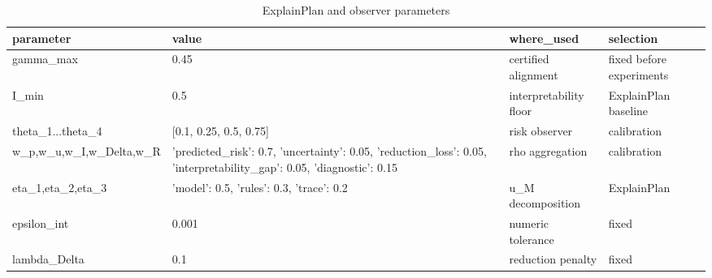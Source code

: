\begin{table}[h]
\centering
\caption{ExplainPlan and observer parameters}
\label{tab:explainplan\_params}
\begin{tabular}{|l|l|l|l|}
\hline
parameter & value & where\_used & selection \\
\hline
gamma\_max & 0.45 & certified alignment & fixed before experiments \\
\hline
I\_min & 0.5 & interpretability floor & ExplainPlan baseline \\
\hline
theta\_1...theta\_4 & [0.1, 0.25, 0.5, 0.75] & risk observer & calibration \\
\hline
w\_p,w\_u,w\_I,w\_Delta,w\_R & {'predicted\_risk': 0.7, 'uncertainty': 0.05, 'reduction\_loss': 0.05, 'interpretability\_gap': 0.05, 'diagnostic': 0.15} & rho aggregation & calibration \\
\hline
eta\_1,eta\_2,eta\_3 & {'model': 0.5, 'rules': 0.3, 'trace': 0.2} & u\_M decomposition & ExplainPlan \\
\hline
epsilon\_int & 0.001 & numeric tolerance & fixed \\
\hline
lambda\_Delta & 0.1 & reduction penalty & fixed \\
\hline
\end{tabular}
\end{table}
